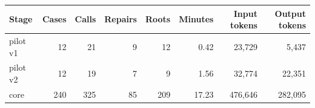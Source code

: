 \begin{tabular}{lrrrrrrr}
\toprule
Stage & Cases & Calls & Repairs & Roots & Minutes & Input tokens & Output tokens \\
\midrule
pilot v1 & 12 & 21 & 9 & 12 & 0.42 & 23,729 & 5,437 \\
pilot v2 & 12 & 19 & 7 & 9 & 1.56 & 32,774 & 22,351 \\
core & 240 & 325 & 85 & 209 & 17.23 & 476,646 & 282,095 \\
\bottomrule
\end{tabular}
